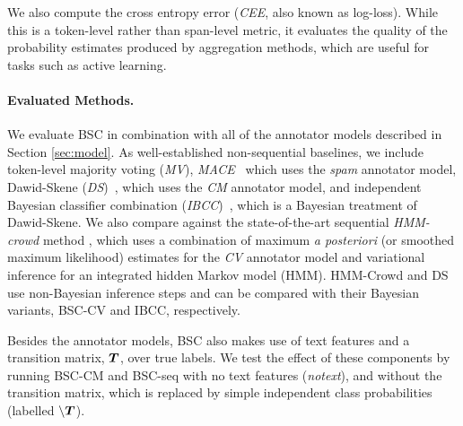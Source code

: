 We also compute the cross entropy error (\emph{CEE}, also known as log-loss).
While this is a token-level rather than span-level metric, it evaluates the quality of the probability estimates produced by aggregation methods, which are useful for tasks such as active learning.

\paragraph{Evaluated Methods. }
We evaluate BSC in combination with all of the annotator models described in Section \ref{sec:model}.
As well-established non-sequential baselines, we include token-level majority voting (\emph{MV}), 
\emph{MACE}~\cite{hovy2013learning} which uses the \emph{spam} annotator
model,
Dawid-Skene (\emph{DS})~\cite{dawid_maximum_1979}, which uses the \emph{CM} annotator model,
 and independent Bayesian classifier combination (\emph{IBCC})~\cite{kim2012bayesian}, which is a Bayesian treatment of Dawid-Skene. 
We also compare against the state-of-the-art sequential \emph{HMM-crowd} method \cite{nguyen2017aggregating}, which uses a combination of 
maximum \emph{a posteriori} (or smoothed maximum likelihood) estimates for the \emph{CV} annotator model 
and variational inference for an integrated hidden Markov model (HMM). 
HMM-Crowd and DS use non-Bayesian inference steps and can be compared with
their Bayesian variants, BSC-CV and IBCC, respectively. 

Besides the annotator models, BSC also makes use of text features and a transition matrix, $\boldsymbol T$, over true labels.
We test the effect of these components by running BSC-CM and BSC-seq with no text features (\emph{notext}), 
and without the transition matrix, which is
 replaced by simple independent class probabilities (labelled $\backslash \boldsymbol T$).
 
